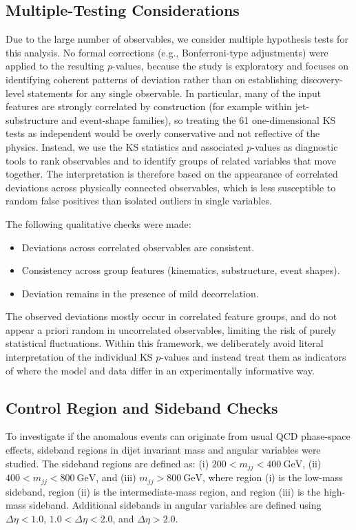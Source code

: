 \documentclass[11pt,a4paper,twocolumn]{article}
\begin{document}
\subsection{Multiple-Testing Considerations}

Due to the large number of observables, we consider multiple hypothesis tests for this analysis. No formal corrections (e.g., Bonferroni-type adjustments) were applied to the resulting $p$-values, because the study is exploratory and focuses on identifying coherent patterns of deviation rather than on establishing discovery-level statements for any single observable. In particular, many of the input features are strongly correlated by construction (for example within jet-substructure and event-shape families), so treating the 61 one-dimensional KS tests as independent would be overly conservative and not reflective of the physics. Instead, we use the KS statistics and associated $p$-values as diagnostic tools to rank observables and to identify groups of related variables that move together. The interpretation is therefore based on the appearance of correlated deviations across physically connected observables, which is less susceptible to random false positives than isolated outliers in single variables.

The following qualitative checks were made:

\begin{itemize}
    \item Deviations across correlated observables are consistent.
    \item Consistency across group features (kinematics, substructure, event shapes).
    \item Deviation remains in the presence of mild decorrelation. 
\end{itemize}

The observed deviations mostly occur in correlated feature groups, and do not appear a priori random in uncorrelated observables, limiting the risk of purely statistical fluctuations. Within this framework, we deliberately avoid literal interpretation of the individual KS $p$-values and instead treat them as indicators of where the model and data differ in an experimentally informative way.

\subsection{Control Region and Sideband Checks}

To investigate if the anomalous events can originate from usual QCD phase-space effects, sideband regions in dijet invariant mass and angular variables were studied. The sideband regions are defined as: (i) $200 < m_{jj} < 400~\mathrm{GeV}$, (ii) $400 < m_{jj} < 800~\mathrm{GeV}$, and (iii) $m_{jj} > 800~\mathrm{GeV}$, where region (i) is the low-mass sideband, region (ii) is the intermediate-mass region, and region (iii) is the high-mass sideband. Additional sidebands in angular variables are defined using $\Delta\eta < 1.0$, $1.0 < \Delta\eta < 2.0$, and $\Delta\eta > 2.0$.
\end{document}
